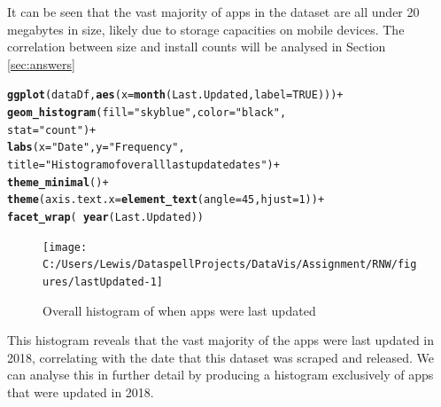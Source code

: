 \documentclass[12pt]{report}\usepackage[]{graphicx}\usepackage[]{xcolor}
\makeatletter
\newcommand{\hlnum}[1]{\textcolor[rgb]{0.686,0.059,0.569}{#1}}%
\newcommand{\hlstr}[1]{\textcolor[rgb]{0.192,0.494,0.8}{#1}}%
\newcommand{\hlopt}[1]{\textcolor[rgb]{0,0,0}{#1}}%
\newcommand{\hlstd}[1]{\textcolor[rgb]{0.345,0.345,0.345}{#1}}%
\newcommand{\hlkwc}[1]{\textcolor[rgb]{0.333,0.667,0.333}{#1}}%
\newcommand{\hlkwd}[1]{\textcolor[rgb]{0.737,0.353,0.396}{\textbf{#1}}}%
\newenvironment{kframe}{%
 \def\at@end@of@kframe{}%
 \ifinner\ifhmode%
  \def\at@end@of@kframe{\end{minipage}}%
  \begin{minipage}{\columnwidth}%
 \fi\fi%
 \def\FrameCommand##1{\hskip\@totalleftmargin \hskip-\fboxsep
 \colorbox{shadecolor}{##1}\hskip-\fboxsep
     \hskip-\linewidth \hskip-\@totalleftmargin \hskip\columnwidth}%
 \MakeFramed {\advance\hsize-\width
   \@totalleftmargin\z@ \linewidth\hsize
   \@setminipage}}%
 {\par\unskip\endMakeFramed%
 \at@end@of@kframe}
\newenvironment{knitrout}{}{} %
\makeatother
\begin{document}
It can be seen that the vast majority of apps in the dataset are all under 20 megabytes in size,
likely due to storage capacities on mobile devices. The correlation between size and install counts
will be analysed in Section \ref{sec:answers}

\begin{knitrout}
\color{fgcolor}\begin{kframe}
\begin{alltt}
\hlkwd{ggplot}\hlstd{(dataDf,} \hlkwd{aes}\hlstd{(}\hlkwc{x} \hlstd{=} \hlkwd{month}\hlstd{(Last.Updated,} \hlkwc{label} \hlstd{=} \hlnum{TRUE}\hlstd{)))} \hlopt{+}
    \hlkwd{geom_histogram}\hlstd{(}\hlkwc{fill} \hlstd{=} \hlstr{"skyblue"}\hlstd{,} \hlkwc{color} \hlstd{=} \hlstr{"black"}\hlstd{,}
                   \hlkwc{stat} \hlstd{=} \hlstr{"count"}\hlstd{)} \hlopt{+}
    \hlkwd{labs}\hlstd{(}\hlkwc{x} \hlstd{=} \hlstr{"Date"}\hlstd{,} \hlkwc{y} \hlstd{=} \hlstr{"Frequency"}\hlstd{,}
         \hlkwc{title} \hlstd{=} \hlstr{"Histogram of overall last update dates"}\hlstd{)} \hlopt{+}
    \hlkwd{theme_minimal}\hlstd{()} \hlopt{+}
    \hlkwd{theme}\hlstd{(}\hlkwc{axis.text.x} \hlstd{=} \hlkwd{element_text}\hlstd{(}\hlkwc{angle} \hlstd{=} \hlnum{45}\hlstd{,} \hlkwc{hjust} \hlstd{=} \hlnum{1}\hlstd{))} \hlopt{+}
    \hlkwd{facet_wrap}\hlstd{(}\hlopt{~}\hlkwd{year}\hlstd{(Last.Updated))}
\end{alltt}
\end{kframe}\begin{figure}[H]

{\centering \texttt{[image: C:/Users/Lewis/DataspellProjects/DataVis/Assignment/RNW/figures/lastUpdated-1]} 

}

\caption[Overall histogram of when apps were last updated]{Overall histogram of when apps were last updated}\label{fig:lastUpdated}
\end{figure}

\end{knitrout}

This histogram reveals that the vast majority of the apps were last updated in 2018, correlating
with the date that this dataset was scraped and released. We can analyse this in further detail by
producing a histogram exclusively of apps that were updated in 2018.
\end{document}
